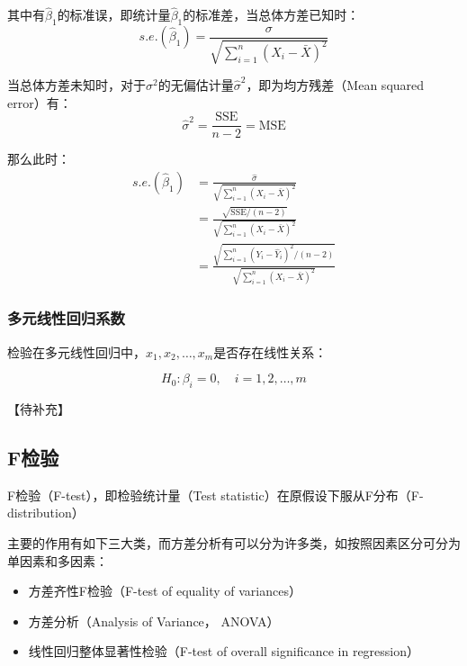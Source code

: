 \documentclass[11pt]{article}
\begin{document}
其中有$\hat{\beta}_1$的标准误，即统计量$\hat{\beta}_1$的标准差，当总体方差已知时：
\begin{equation*}
    s.e.(\hat{\beta}_1) = \frac{\sigma}{\sqrt{\sum_{i=1}^{n} (X_i - \bar{X})^2}}
\end{equation*}

当总体方差未知时，对于$\sigma^2$的无偏估计量$\hat{\sigma}^2$，即为均方残差（Mean squared error）有：
\begin{equation*}
    \hat{\sigma}^2 = \frac{\text{SSE}}{n-2} = \text{MSE}
\end{equation*}

那么此时：
\begin{align*}
    s.e.(\hat{\beta}_1) &= \frac{\hat{\sigma}}{\sqrt{\sum_{i=1}^{n} (X_i - \bar{X})^2}} \\
    &= \frac{\sqrt{\text{SSE}/(n-2)}}{\sqrt{\sum_{i=1}^{n} (X_i - \bar{X})^2}} \\
    &= \frac{\sqrt{\sum_{i=1}^{n} (Y_i - \hat{Y}_i)^2 / (n-2)}}{\sqrt{\sum_{i=1}^{n} (X_i - \bar{X})^2}}
\end{align*}

\subsubsection{多元线性回归系数}

检验在多元线性回归中，$x_1,x_2,\dots,x_m$是否存在线性关系：

\begin{equation*}
    H_0: \beta_i = 0, \quad i=1,2,\dots,m
\end{equation*}

【待补充】

\subsection{F检验}

F检验（F-test），即检验统计量（Test statistic）在原假设下服从F分布（F-distribution）

主要的作用有如下三大类，而方差分析有可以分为许多类，如按照因素区分可分为单因素和多因素：
\begin{itemize}
    \item 方差齐性F检验（F-test of equality of variances）
    \item 方差分析（Analysis of Variance， ANOVA）
    \item 线性回归整体显著性检验（F-test of overall significance in regression）
\end{itemize}
\end{document}
